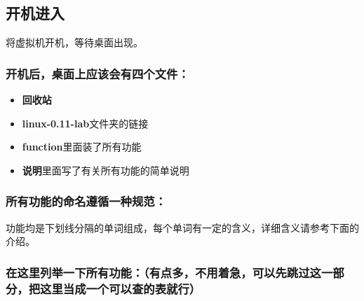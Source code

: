 \documentclass[]{report}
\begin{document}
\subsection{开机进入}

将虚拟机开机，等待桌面出现。

\subsubsection{开机后，桌面上应该会有四个文件：}

\begin{itemize}
    \item \textbf{回收站}\quad 
    \item \textbf{linux-0.11-lab}\quad 文件夹的链接
    \item \textbf{function}\quad 里面装了所有功能
    \item \textbf{说明}\quad 里面写了有关所有功能的简单说明
\end{itemize}

\subsubsection{所有功能的命名遵循一种规范：}

功能均是下划线分隔的单词组成，每个单词有一定的含义，详细含义请参考下面的介绍。

\subsubsection{在这里列举一下所有功能：（有点多，不用着急，可以先跳过这一部分，把这里当成一个可以查的表就行）}
\end{document}
